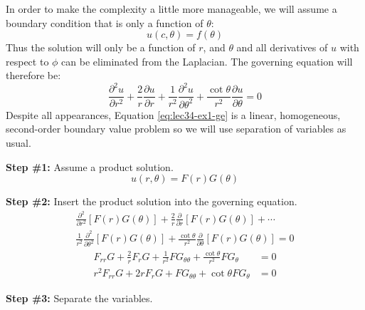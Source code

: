 \noindent In order to make the complexity a little more manageable, we will assume a boundary condition that is only a function of $\theta$:
\begin{equation*}
u(c,\theta) = f(\theta)
\end{equation*}
Thus the solution will only be a function of $r$, and $\theta$ and all derivatives of $u$ with respect to $\phi$ can be eliminated from the Laplacian.  The governing equation will therefore be:
\begin{equation}
\frac{\partial^2 u}{\partial r^2} + \frac{2}{r}\frac{\partial u}{\partial r} + \frac{1}{r^2}\frac{\partial^2 u}{\partial \theta^2} + \frac{\cot{\theta}}{r^2}\frac{\partial u}{\partial \theta} = 0
\label{eq:lec34-ex1-ge}
\end{equation}
Despite all appearances, Equation \ref{eq:lec34-ex1-ge} is a linear, homogeneous, second-order boundary value problem so we will use separation of variables as usual.

\vspace{0.25cm}

\noindent\textbf{Step \#1:} Assume a product solution.
\begin{equation*}
u(r,\theta) = F(r)G(\theta)
\end{equation*}

\vspace{0.25cm}

\noindent\textbf{Step \#2:} Insert the product solution into the governing equation.
\begin{multline*}
\frac{\partial^2}{\partial r^2}\left[F(r)G(\theta)\right] + \frac{2}{r}\frac{\partial}{\partial r}\left[ F(r)G(\theta)\right] + \cdots \\
\frac{1}{r^2}\frac{\partial^2}{\partial \theta^2}\left[F(r)G(\theta)\right] + \frac{\cot{\theta}}{r^2}\frac{\partial}{\partial \theta}\left[F(r)G(\theta)\right] = 0 
\end{multline*}
\begin{align*}
F_{rr}G + \frac{2}{r}F_rG + \frac{1}{r^2}FG_{\theta \theta} + \frac{\cot{\theta}}{r^2}FG_{\theta} &= 0 \\
r^2F_{rr}G + 2rF_rG + FG_{\theta \theta} + \cot{\theta}FG_{\theta}&= 0
\end{align*}

\vspace{0.25cm}

\noindent\textbf{Step \#3:} Separate the variables.

